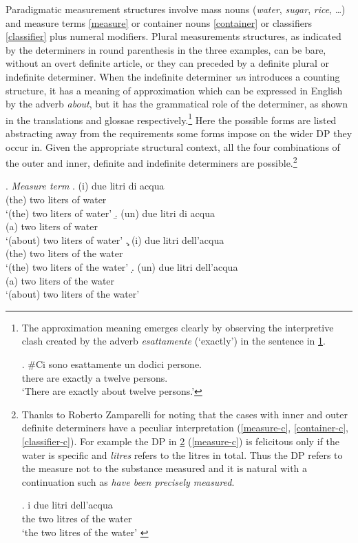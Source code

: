 \documentclass[charis, linguex]{glossa}
\begin{document}
Paradigmatic measurement structures involve mass nouns (\textit{water}, \textit{sugar}, \textit{rice}, \dots) and measure terms \ref{measure} or container nouns \ref{container} or classifiers \ref{classifier} plus numeral modifiers. Plural measurements structures, as indicated by the determiners in round parenthesis in the three examples, can be bare, without an overt definite article, or they can preceded by a definite plural or indefinite determiner. When the indefinite determiner \textit{un} introduces a counting structure, it has a meaning of approximation which can be expressed in English by the adverb \textit{about}, but it has the grammatical role of the determiner, as shown in the translations and glossae respectively.\footnote{\label{fnlabel}The approximation meaning emerges clearly  by observing the interpretive clash created by  the adverb \textit{esattamente} (`exactly') in the  sentence in \ref{esatto}.

\exg. \#Ci sono esattamente un dodici persone. \\
          there are exactly a twelve persons.  \\ \label{esatto}
          \glt  `There are exactly about twelve persons.'
} Here the possible forms are listed abstracting away from the requirements some forms impose on the wider DP they occur in. Given the appropriate structural context, all the four combinations of the outer and inner, definite and indefinite determiners are possible.\footnote{Thanks to Roberto Zamparelli for noting that the cases with inner and outer definite determiners have a peculiar interpretation  (\ref{measure-c},  \ref{container-c}, \ref{classifier-c}). For example the DP in \ref{defdef} (\ref{measure-c}) is felicitous only if the water is specific and \textit{litres} refers to the litres  in total. Thus the DP refers to the measure not to the substance measured and it is natural with a continuation such as \textit{have been precisely measured}.

\exg. i due litri dell'acqua \\
the two litres {of the water} \\ 
\glt  `the two litres of the water' \label{defdef}

}


 
\ex. \textit{Measure term}  \label{measure}
	\a. \gll (i) due litri di acqua \\
      (the) two liters of water \\ 
	 \glt  `(the) two liters of water'  \label{measure-a}
 	\b. \gll (un) due litri di acqua \\
       (a) two liters of water \\ 
 	 \glt  `(about) two liters of water'  \label{measure-b}	 
 	\c. \gll (i) due litri dell'acqua \\
       (the) two liters {of the} water \\ 
 	 \glt  `(the) two liters of the water'  \label{measure-c}
  	\d. \gll (un) due litri dell'acqua \\
        (a) two liters {of the} water \\ 
  	 \glt  `(about) two liters of the water'  \label{measure-d}
	 
\end{document}
